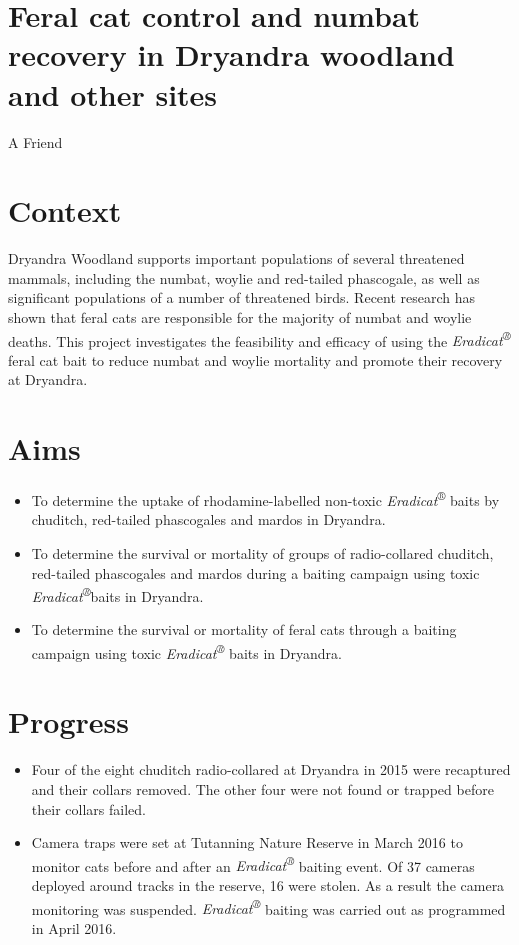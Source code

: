 \documentclass[version=last,
    paper=a4, %
    10pt, %
    usenames,
    dvipsnames,
    oneside, %
    headings=openany, %
    DIV=15 %
]{scrbook}
\begin{document}
\section*{Feral cat control and numbat recovery in Dryandra woodland and other
sites
}

A Friend



\section*{Context}

Dryandra Woodland supports important populations of several threatened
mammals, including the numbat, woylie and red-tailed phascogale, as well
as significant populations of a number of threatened birds. Recent
research has shown that feral cats are responsible for the majority of
numbat and woylie deaths. This project investigates the feasibility and
efficacy of using the \emph{Eradicat\textsuperscript{®}} feral cat bait
to reduce numbat and woylie mortality and promote their recovery at
Dryandra.




\section*{Aims}

\begin{itemize}
\itemsep1pt\parskip0pt
\item
  To determine the uptake of rhodamine-labelled non-toxic
  \emph{Eradicat}\textsuperscript{®} baits by chuditch, red-tailed
  phascogales and mardos in Dryandra.
\item
  To determine the survival or mortality of groups of radio-collared
  chuditch, red-tailed phascogales and mardos during a baiting campaign
  using toxic \emph{Eradicat\textsuperscript{®}}baits in Dryandra.
\item
  To determine the survival or mortality of feral cats through a baiting
  campaign using toxic \emph{Eradicat\textsuperscript{®}} baits in
  Dryandra.
\end{itemize}




\section*{Progress}

\begin{itemize}
\itemsep1pt\parskip0pt
\item
  Four of the eight chuditch radio-collared at Dryandra in 2015 were
  recaptured and their collars removed. The other four were not found or
  trapped before their collars failed.
\item
  Camera traps were set at Tutanning Nature Reserve in March 2016 to
  monitor cats before and after an \emph{Eradicat\textsuperscript{®}}
  baiting event. Of 37 cameras deployed around tracks in the reserve, 16
  were stolen. As a result the camera monitoring was suspended.
  \emph{Eradicat\textsuperscript{®}} baiting was carried out as
  programmed in April 2016.
\end{itemize}
\end{document}
